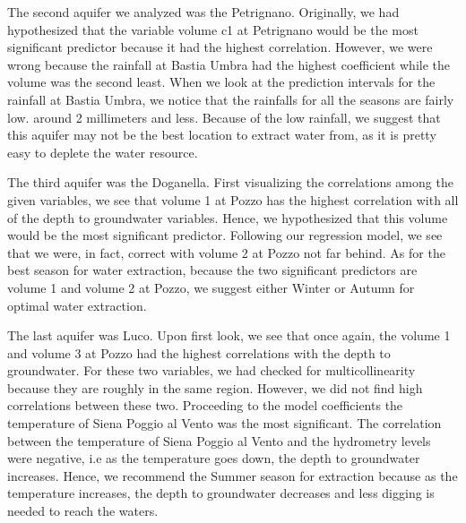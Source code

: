 \documentclass[12pt, letterpaper]{article}
\begin{document}
The second aquifer we analyzed was the Petrignano. Originally, we had hypothesized that the variable volume c1 at Petrignano would be the most significant predictor because it had the highest correlation. However, we were wrong because the rainfall at Bastia Umbra had the highest coefficient while the volume was the second least. When we look at the prediction intervals for the rainfall at Bastia Umbra, we notice that the rainfalls for all the seasons are fairly low. around 2 millimeters and less. Because of the low rainfall, we suggest that this aquifer may not be the best location to extract water from, as it is pretty easy to deplete the water resource. 

The third aquifer was the Doganella. First visualizing the correlations among the given variables, we see that volume 1 at Pozzo has the highest correlation with all of the depth to groundwater variables. Hence, we hypothesized that this volume would be the most significant predictor. Following our regression model, we see that we were, in fact, correct with volume 2 at Pozzo not far behind. As for the best season for water extraction, because the two significant predictors are volume 1 and volume 2 at Pozzo, we suggest either Winter or Autumn for optimal water extraction. 

The last aquifer was Luco. Upon first look, we see that once again, the volume 1 and volume 3 at Pozzo had the highest correlations with the depth to groundwater. For these two variables, we had checked for multicollinearity because they are roughly in the same region. However, we did not find high correlations between these two. Proceeding to the model coefficients the temperature of Siena Poggio al Vento was the most significant. The correlation between the temperature of Siena Poggio al Vento and the hydrometry levels were negative, i.e as the temperature goes down, the depth to groundwater increases. Hence, we recommend the Summer season for extraction because as the temperature increases, the depth to groundwater decreases and less digging is needed to reach the waters. 
\end{document}
